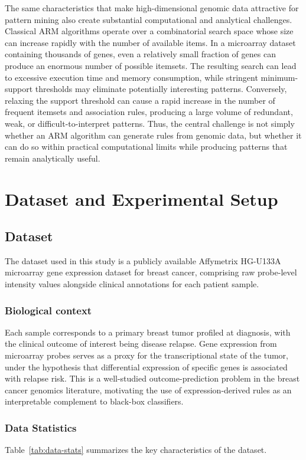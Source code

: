 \documentclass[twocolumn]{article}
\begin{document}
The same characteristics that make high-dimensional genomic data attractive for pattern mining also create substantial computational and analytical challenges. Classical ARM algorithms operate over a combinatorial search space whose size can increase rapidly with the number of available items. In a microarray dataset containing thousands of genes, even a relatively small fraction of genes can produce an enormous number of possible itemsets. The resulting search can lead to excessive execution time and memory consumption, while stringent minimum-support thresholds may eliminate potentially interesting patterns. Conversely, relaxing the support threshold can cause a rapid increase in the number of frequent itemsets and association rules, producing a large volume of redundant, weak, or difficult-to-interpret patterns. Thus, the central challenge is not simply whether an ARM algorithm can generate rules from genomic data, but whether it can do so within practical computational limits while producing patterns that remain analytically useful.

\section{Dataset and Experimental Setup}

\subsection{Dataset}

The dataset used in this study is a publicly available Affymetrix HG-U133A microarray
gene expression dataset for breast cancer, comprising raw probe-level intensity values
alongside clinical annotations for each patient sample.

\subsubsection{Biological context}
Each sample corresponds to a primary breast tumor profiled at diagnosis, with the
clinical outcome of interest being disease relapse. Gene expression from microarray
probes serves as a proxy for the transcriptional state of the tumor, under the
hypothesis that differential expression of specific genes is associated with relapse
risk. This is a well-studied outcome-prediction problem in the breast cancer genomics
literature, motivating the use of expression-derived rules as an interpretable
complement to black-box classifiers.

\subsubsection{Data Statistics}
Table~\ref{tab:data-stats} summarizes the key characteristics of the dataset.
\end{document}
